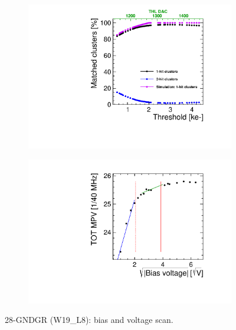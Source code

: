 \begin{figure}[htbp] \centering
  \begin{subfigure}[b]{0.45\textwidth}
    \includegraphics[width=\textwidth]{./figures/TestBeam/ThresholdScan_W0019_L08.pdf}
    \caption{}
  \end{subfigure} \hfill
  \begin{subfigure}[b]{0.45\textwidth}
    \includegraphics[width=\textwidth]{./figures/TestBeam/depletionVoltage_W0019_L08.pdf}
    \caption{}
  \end{subfigure}
  \caption{28-GNDGR (W19\_L8): bias and voltage scan.}
  \label{fig:Timepix3_THLscan_Vdep_L8}
\end{figure}


